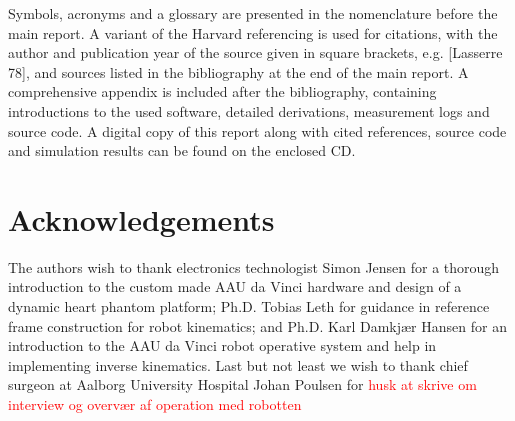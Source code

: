 Symbols, acronyms and a glossary are presented in the nomenclature before the main report.
A variant of the Harvard referencing is used for citations, with the author and publication year of the source given in square brackets, e.g. [Lasserre 78], and sources listed in the bibliography at the end of the main report. %
A comprehensive appendix is included after the bibliography, containing introductions to the used software, detailed derivations, measurement logs and source code.
A digital copy of this report along with cited references, source code and simulation results can be found on the enclosed CD.

\vspace*{-2mm}
\section*{Acknowledgements}
\vspace*{-2mm}
The authors wish to thank electronics technologist Simon Jensen for a thorough introduction to the custom made AAU da Vinci hardware and design of a dynamic heart phantom platform; Ph.D. Tobias Leth for guidance in reference frame construction for robot kinematics; and  Ph.D. Karl Damkj\ae r Hansen for an introduction to the AAU da Vinci robot operative system and help in implementing inverse kinematics. Last but not least we wish to thank chief surgeon at Aalborg University Hospital Johan Poulsen for \textcolor{red}{husk at skrive om interview og overvær af operation med robotten}


